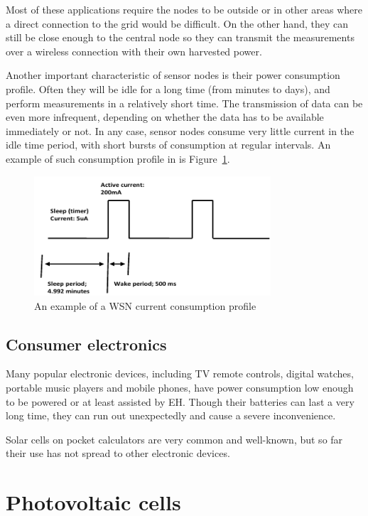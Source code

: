 \documentclass[a4paper,10pt]{article}
\begin{document}
Most of these applications require the nodes to be outside or in other areas where a direct connection to the grid would be difficult. On the other hand, they can still be close enough to the central node so they can transmit the measurements over a wireless connection with their own harvested power. 

Another important characteristic of sensor nodes is their power consumption profile. Often they will be idle for a long time (from minutes to days), and perform measurements in a relatively short time. The transmission of data can be even more infrequent, depending on whether the data has to be available immediately or not. In any case, sensor nodes consume very little current in the idle time period, with short bursts of consumption at regular intervals. An example of such consumption profile in is Figure~\ref{fig:wsn-consumption}. 

\begin{figure}[h]
\centering
 \includegraphics[width=250pt]{./Slike/wsn-current-profile}
 \caption{An example of a \ac{WSN} current consumption profile~\cite{cap-wsn-ieee}}
\label{fig:wsn-consumption}
\end{figure}


\subsection{Consumer electronics}

Many popular electronic devices, including TV remote controls, digital watches, portable music players and mobile phones, have power consumption low enough to be powered or at least assisted by \ac{EH}. Though their batteries can last a very long time, they can run out unexpectedly and cause a severe inconvenience. 

Solar cells on pocket calculators are very common and well-known, but so far their use has not spread to other electronic devices. 

\section{Photovoltaic cells}
\end{document}
